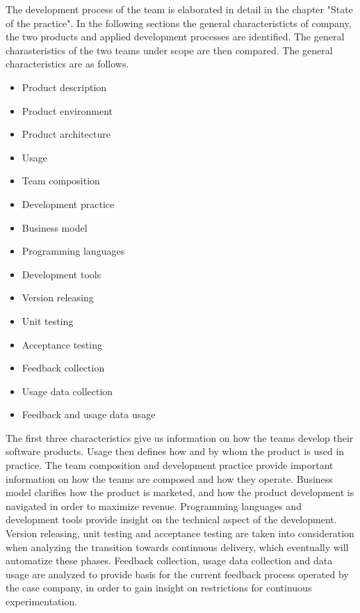 \documentclass[english]{tktltiki2}
\theoremstyle{definition}
\theoremstyle{remark}
\begin{document}
The development process of the team is elaborated in detail in the chapter "State of the practice". In the following sections the general characteristicts of company, the two products and applied development processes are identified. The general charasteristics of the two teams under scope are then compared. The general characteristics are as follows. 

\begin{multicols}{2}
\begin{itemize}
  \item Product description
  \item Product environment
  \item Product architecture
  \item Usage
  \item Team composition
  \item Development practice
  \item Business model
  \item Programming languages
  \item Development tools
  \item Version releasing
  \item Unit testing
  \item Acceptance testing
  \item Feedback collection
  \item Usage data collection
  \item Feedback and usage data usage
\end{itemize}
\end{multicols}

The first three characteristics give us information on how the teams develop their software products. Usage then defines how and by whom the product is used in practice. The team composition and development practice provide important information on how the teams are composed and how they operate. Business model clarifies how the product is marketed, and how the product development is navigated in order to maximize revenue. Programming languages and development tools provide insight on the technical aspect of the development. Version releasing, unit testing and acceptance testing are taken into consideration when analyzing the transition towards continuous delivery, which eventually will automatize these phases. Feedback collection, usage data collection and data usage are analyzed to provide basis for the current feedback process operated by the case company, in order to gain insight on restrictions for continuous experimentation. 
\end{document}
